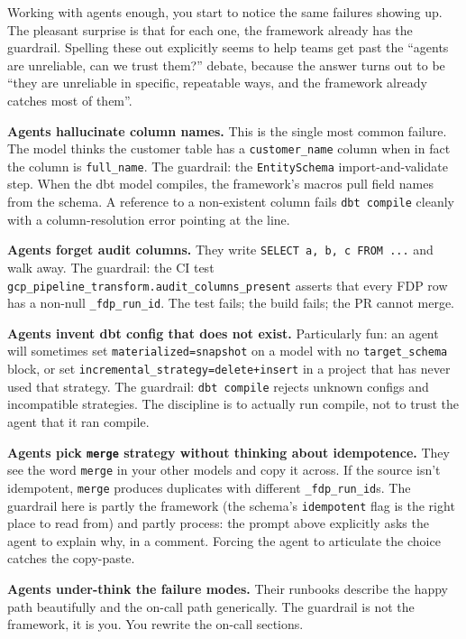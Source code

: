\documentclass[
  11pt,
  british,
  oneside]{book}
\begin{document}
Working with agents enough, you start to notice the same failures
showing up. The pleasant surprise is that for each one, the framework
already has the guardrail. Spelling these out explicitly seems to help
teams get past the ``agents are unreliable, can we trust them?'' debate,
because the answer turns out to be ``they are unreliable in specific,
repeatable ways, and the framework already catches most of them''.

\textbf{Agents hallucinate column names.} This is the single most common
failure. The model thinks the customer table has a
\texttt{customer\_name} column when in fact the column is
\texttt{full\_name}. The guardrail: the \texttt{EntitySchema}
import-and-validate step. When the dbt model compiles, the framework's
macros pull field names from the schema. A reference to a non-existent
column fails \texttt{dbt\ compile} cleanly with a column-resolution
error pointing at the line.

\textbf{Agents forget audit columns.} They write
\texttt{SELECT\ a,\ b,\ c\ FROM\ ...} and walk away. The guardrail: the
CI test \texttt{gcp\_pipeline\_transform.audit\_columns\_present}
asserts that every FDP row has a non-null \texttt{\_fdp\_run\_id}. The
test fails; the build fails; the PR cannot merge.

\textbf{Agents invent dbt config that does not exist.} Particularly fun:
an agent will sometimes set
\texttt{materialized=\textquotesingle{}snapshot\textquotesingle{}} on a
model with no \texttt{target\_schema} block, or set
\texttt{incremental\_strategy=\textquotesingle{}delete+insert\textquotesingle{}}
in a project that has never used that strategy. The guardrail:
\texttt{dbt\ compile} rejects unknown configs and incompatible
strategies. The discipline is to actually run compile, not to trust the
agent that it ran compile.

\textbf{Agents pick \texttt{merge} strategy without thinking about
idempotence.} They see the word \texttt{merge} in your other models and
copy it across. If the source isn't idempotent, \texttt{merge} produces
duplicates with different \texttt{\_fdp\_run\_id}s. The guardrail here
is partly the framework (the schema's \texttt{idempotent} flag is the
right place to read from) and partly process: the prompt above
explicitly asks the agent to explain why, in a comment. Forcing the
agent to articulate the choice catches the copy-paste.

\textbf{Agents under-think the failure modes.} Their runbooks describe
the happy path beautifully and the on-call path generically. The
guardrail is not the framework, it is you. You rewrite the on-call
sections.
\end{document}
